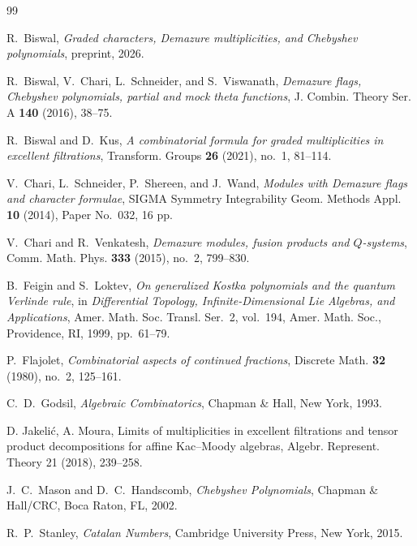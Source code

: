 \documentclass[12pt]{amsart}
\theoremstyle{definition}
\theoremstyle{remark}
\begin{document}
\begin{thebibliography}{99}

R.~Biswal,
\emph{Graded characters, Demazure multiplicities, and Chebyshev polynomials},
preprint, 2026.

R.~Biswal, V.~Chari, L.~Schneider, and S.~Viswanath,
\emph{Demazure flags, Chebyshev polynomials, partial and mock theta functions},
J. Combin. Theory Ser. A \textbf{140} (2016), 38--75.

R.~Biswal and D.~Kus,
\emph{A combinatorial formula for graded multiplicities in excellent filtrations},
Transform. Groups \textbf{26} (2021), no.~1, 81--114.

V.~Chari, L.~Schneider, P.~Shereen, and J.~Wand,
\emph{Modules with Demazure flags and character formulae},
SIGMA Symmetry Integrability Geom. Methods Appl. \textbf{10} (2014), Paper No.~032, 16 pp.

V.~Chari and R.~Venkatesh,
\emph{Demazure modules, fusion products and $Q$-systems},
Comm. Math. Phys. \textbf{333} (2015), no.~2, 799--830.

B.~Feigin and S.~Loktev,
\emph{On generalized Kostka polynomials and the quantum Verlinde rule},
in \emph{Differential Topology, Infinite-Dimensional Lie Algebras, and Applications},
Amer. Math. Soc. Transl. Ser.~2, vol.~194, Amer. Math. Soc., Providence, RI, 1999,
pp.~61--79.

P.~Flajolet,
\emph{Combinatorial aspects of continued fractions},
Discrete Math. \textbf{32} (1980), no.~2, 125--161.

C.~D.~Godsil,
\emph{Algebraic Combinatorics},
Chapman \& Hall, New York, 1993.

 D. Jakeli\'{c}, A. Moura, Limits of multiplicities in excellent filtrations and tensor product decompositions for affine Kac--Moody algebras, Algebr. Represent. Theory 21 (2018), 239--258.



J.~C.~Mason and D.~C.~Handscomb,
\emph{Chebyshev Polynomials},
Chapman \& Hall/CRC, Boca Raton, FL, 2002.

R.~P.~Stanley,
\emph{Catalan Numbers},
Cambridge University Press, New York, 2015.

\end{thebibliography}
\end{document}
